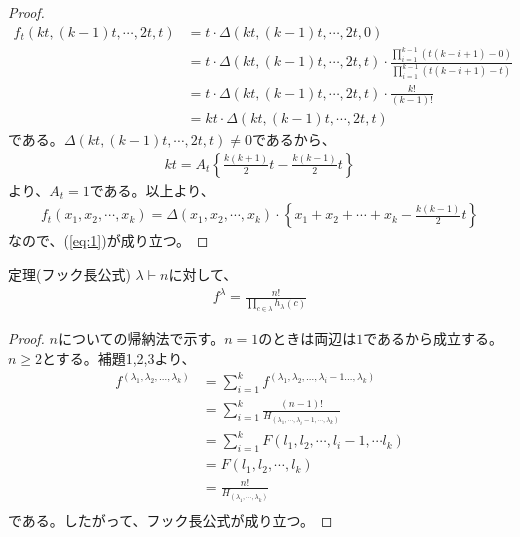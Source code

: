 \documentclass[a4paper,11pt]{jsarticle}
\theoremstyle{plain}
\theoremstyle{definition}
\renewcommand{\(}{\left(}
\renewcommand{\)}{\right)}
\renewcommand{\[}{\left[}
\renewcommand{\]}{\right]}
\renewcommand{\{}{\left\lbrace}
\renewcommand{\}}{\right\rbrace}
\begin{document}
\begin{proof}
    \begin{align*}
        f_t(kt, (k-1)t, \cdots, 2t, t) &= t \cdot \Delta(kt, (k-1)t, \cdots, 2t, 0) \\
        &= t \cdot \Delta(kt, (k-1)t, \cdots, 2t, t) \cdot \frac{\prod_{i=1}^{k-1} (t(k-i+1) - 0)}{\prod_{i=1}^{k-1} (t(k-i+1) - t)} \\
        &= t \cdot \Delta(kt, (k-1)t, \cdots, 2t, t) \cdot \frac{k!}{(k-1)!} \\
        &= kt \cdot \Delta(kt, (k-1)t, \cdots, 2t, t)
    \end{align*}
    である。$\Delta(kt, (k-1)t, \cdots, 2t, t) \neq 0$であるから、
    \begin{align*}
        kt = A_t \{\frac{k(k+1)}{2} t - \frac{k(k-1)}{2} t \}
    \end{align*}
    より、$A_t = 1$である。以上より、
    \begin{align*}
        f_t(x_1, x_2, \cdots, x_k) = \Delta(x_1, x_2, \cdots, x_k) \cdot \{x_1 + x_2 + \cdots + x_k - \frac{k(k-1)}{2} t \}
    \end{align*}
    なので、(\ref{eq:1})が成り立つ。
\end{proof}


\begin{itembox}[l]{定理(フック長公式)}
    $\lambda \vdash n$に対して、
    \begin{align*}
        f^\lambda = \frac{n!}{\prod_{c \in \lambda} h_{\lambda}(c)}
    \end{align*}
\end{itembox}

\begin{proof}
    $n$についての帰納法で示す。$n=1$のときは両辺は$1$であるから成立する。$n \geq 2$とする。補題1,2,3より、
    \begin{align*}
        f^{(\lambda_1, \lambda_2, \ldots, \lambda_k)} &= \sum_{i=1}^{k} f^{(\lambda_1, \lambda_2, \ldots, \lambda_i - 1 \ldots, \lambda_{k})} \\
        &= \sum_{i=1}^{k} \frac{(n-1)!}{H_{(\lambda_1, \cdots, \lambda_i - 1, \cdots, \lambda_k)}} \\
        &= \sum_{i=1}^{k} F(l_1, l_2, \cdots, l_i - 1,\cdots  l_k) \\
        &= F(l_1, l_2, \cdots, l_k) \\
        &= \frac{n!}{H_{(\lambda_1, \cdots, \lambda_k)}} \\
    \end{align*}
    である。したがって、フック長公式が成り立つ。
\end{proof}
\end{document}
